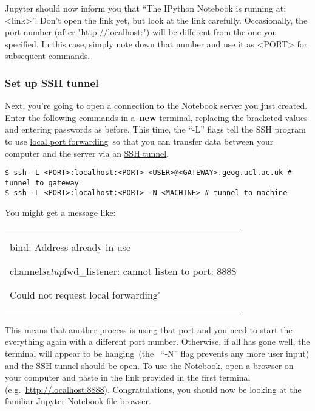 \documentclass[10pt,a4]{article}
\renewenvironment{quote}
  {\begin{tabular}{|p{13cm}}}
  {\end{tabular}}
\begin{document}
Jupyter should now inform you that ``The IPython Notebook is running at:
\textless{}link\textgreater{}''. Don't open the link yet, but look at
the link carefully. Occasionally, the port number (after
"\url{http://localhost}:") will be different from the one you specified.
In this case, simply note down that number and use it as
\textless{}PORT\textgreater{} for subsequent commands.

\subsubsection{Set up SSH tunnel}

\label{813174}

Next, you're going to open a connection to the Notebook server you just
created. Enter the following commands in a~\textbf{new} terminal,
replacing the bracketed values and entering passwords as before. This
time, the ``-L'' flags tell the SSH program to use
\href{https://help.ubuntu.com/community/SSH/OpenSSH/PortForwarding}{local
port forwarding}~so that you can transfer data between your computer and
the server via an
\href{http://blog.trackets.com/2014/05/17/ssh-tunnel-local-and-remote-port-forwarding-explained-with-examples.html}{SSH
tunnel}.


\begin{lstlisting}
$ ssh -L <PORT>:localhost:<PORT> <USER>@<GATEWAY>.geog.ucl.ac.uk # tunnel to gateway
$ ssh -L <PORT>:localhost:<PORT> -N <MACHINE> # tunnel to machine
\end{lstlisting}

You might get a message like:

\begin{quote}
bind: Address already in use

channel\emph{setup}fwd\_listener: cannot listen to port: 8888

Could not request local forwarding"
\end{quote}

This means that another process is using that port and you need to start
the everything again with a different port number. Otherwise, if all has
gone well, the terminal will appear to be hanging~(the ~``-N'' flag
prevents any more user input) and the SSH tunnel should be open. To use
the Notebook, open a browser on your computer and paste in the link
provided in the first terminal (e.g.~\url{http://localhost:8888}).
Congratulations, you should now be looking at the familiar Jupyter
Notebook file browser.
\end{document}
